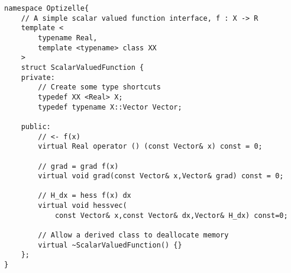 \begin{lstlisting}[style=C++]
namespace Optizelle{
    // A simple scalar valued function interface, f : X -> R
    template <
        typename Real,
        template <typename> class XX
    >
    struct ScalarValuedFunction {
    private:
        // Create some type shortcuts
        typedef XX <Real> X;
        typedef typename X::Vector Vector;

    public:
        // <- f(x) 
        virtual Real operator () (const Vector& x) const = 0;

        // grad = grad f(x) 
        virtual void grad(const Vector& x,Vector& grad) const = 0;

        // H_dx = hess f(x) dx 
        virtual void hessvec(
            const Vector& x,const Vector& dx,Vector& H_dx) const=0;

        // Allow a derived class to deallocate memory
        virtual ~ScalarValuedFunction() {}
    };
}
\end{lstlisting}
